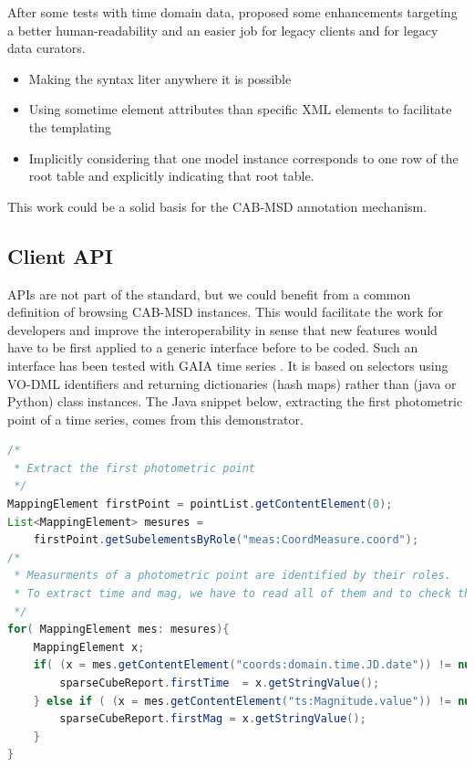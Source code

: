 \documentclass[11pt,a4paper]{ivoa}
\begin{document}
After some tests with time domain data, \cite{talk:lmlite} \cite{talk:lmgaia} proposed some enhancements targeting a better human-readability and an easier job for legacy clients and for legacy data curators.

\begin{itemize}
\item Making the syntax liter anywhere it is possible
\item Using sometime element attributes than specific XML elements to facilitate the templating
\item Implicitly considering that one model instance corresponds to one row of the root table and explicitly indicating that root table.
\end{itemize}

This work could be a solid basis for the CAB-MSD annotation mechanism.

\subsection{Client API}
APIs are not part of the standard, but we could benefit from a common definition of browsing CAB-MSD instances.  This would facilitate the work for developers and improve the interoperability in sense that new features would have to be first applied to a generic interface before to be coded.
Such an interface has been tested with GAIA time series \citep{talk:lmparser}. It is based on selectors using VO-DML identifiers and returning dictionaries (hash maps) rather than (java or Python) class instances. 
The Java snippet below, extracting the first photometric point of a time series, comes from this demonstrator. 

\begin{lstlisting}[language=java]
/*
 * Extract the first photometric point
 */
MappingElement firstPoint = pointList.getContentElement(0);		
List<MappingElement> mesures =
    firstPoint.getSubelementsByRole("meas:CoordMeasure.coord");
/*
 * Measurments of a photometric point are identified by their roles. 
 * To extract time and mag, we have to read all of them and to check the roles
 */
for( MappingElement mes: mesures){
	MappingElement x;
	if( (x = mes.getContentElement("coords:domain.time.JD.date")) != null ) {
		sparseCubeReport.firstTime  = x.getStringValue();
	} else if ( (x = mes.getContentElement("ts:Magnitude.value")) != null ) {
	    sparseCubeReport.firstMag = x.getStringValue();
	} 
}
\end{lstlisting}
\end{document}
